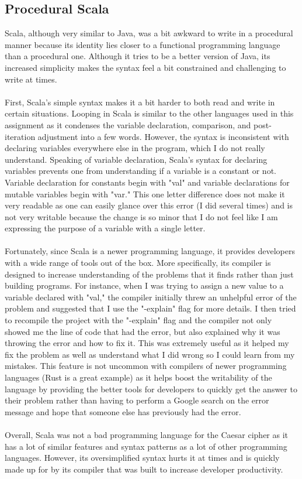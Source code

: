 \documentclass[letterpaper, 10pt, DIV=13]{scrartcl}
\numberwithin{equation}{section}
\numberwithin{figure}{section}
\numberwithin{table}{section}
\begin{document}
\subsection{Procedural Scala}
Scala, although very similar to Java, was a bit awkward to write in a procedural manner because its identity lies closer to a functional programming language than a procedural one. Although it tries to be a better version of Java, its increased simplicity makes the syntax feel a bit constrained and challenging to write at times.
\\ \\
First, Scala's simple syntax makes it a bit harder to both read and write in certain situations. Looping in Scala is similar to the other languages used in this assignment as it condenses the variable declaration, comparison, and post-iteration adjustment into a few words. However, the syntax is inconsistent with declaring variables everywhere else in the program, which I do not really understand. Speaking of variable declaration, Scala's syntax for declaring variables prevents one from understanding if a variable is a constant or not. Variable declaration for constants begin with "val" and variable declarations for mutable variables begin with "var." This one letter difference does not make it very readable as one can easily glance over this error (I did several times) and is not very writable because the change is so minor that I do not feel like I am expressing the purpose of a variable with a single letter.
\\ \\
Fortunately, since Scala is a newer programming language, it provides developers with a wide range of tools out of the box. More specifically, its compiler is designed to increase understanding of the problems that it finds rather than just building programs. For instance, when I was trying to assign a new value to a variable declared with "val," the compiler initially threw an unhelpful error of the problem and suggested that I use the "-explain" flag for more details. I then tried to recompile the project with the "-explain" flag and the compiler not only showed me the line of code that had the error, but also explained why it was throwing the error and how to fix it. This was extremely useful as it helped my fix the problem as well as understand what I did wrong so I could learn from my mistakes. This feature is not uncommon with compilers of newer programming languages (Rust is a great example) as it helps boost the writability of the language by providing the better tools for developers to quickly get the answer to their problem rather than having to perform a Google search on the error message and hope that someone else has previously had the error.
\\ \\
Overall, Scala was not a bad programming language for the Caesar cipher as it has a lot of similar features and syntax patterns as a lot of other programming languages. However, its oversimplified syntax hurts it at times and is quickly made up for by its compiler that was built to increase developer productivity.
\end{document}
